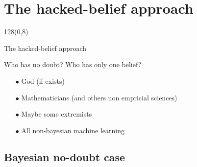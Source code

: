 \documentclass[shownotes]{beamer}
\begin{document}
\section{The hacked-belief approach}

\begin{frame}
 \begin{textblock}{128}(0,8)
\begin{center}
 \Large The hacked-belief approach
\end{center}
\end{textblock}
\vspace{0.5cm}


\begin{center}
 
 \begin{mdframed}
 \centering
  Who has no doubt? Who has only one belief?
 \end{mdframed}
 
 \vspace{0.3cm}
 \pause
 
 \begin{itemize}
  \item[$\bullet$] God (if exists) \pause
  \item[$\bullet$] Mathematicians (and others non empricial sciences) \pause
  \item[$\bullet$] Maybe some extremists \pause
  \item[$\bullet$] \huge All non-bayesian machine learning
 \end{itemize}

 
 
 
\end{center}

 
\end{frame}

\subsection{Bayesian no-doubt case}
\end{document}
